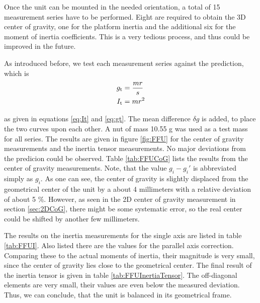 \documentclass[journal]{IEEEtran}
\begin{document}
Once the unit can be mounted in the needed orientation, a total of 15 measurement series have to be performed. Eight are required to obtain the 3D center of gravity, one for the platform inertia and the additional six for the moment of inertia coefficients.
This is a very tedious process, and thus could be improved in the future.

As introduced before, we test each measurement series against the prediction, which is
\begin{align*}
	g_{\textup{t}} & =	\frac{mr}{s} \\
	I_{\textup{t}} & = mr^2
\end{align*}

as given in equations \eqref{eq:It} and \eqref{eq:gt}. The mean difference $\delta g$ is added, to place the two curves upon each other.
A nut of mass 10.55 g was used as a test mass for all series.
The results are given in figure \ref{fig:FFU} for the center of gravity measurements and the inertia tensor measurements.
No major deviations from the predicion could be observed.
Table \ref{tab:FFUCoG} lists the results from the center of gravity measurements.
Note, that the value $g_i - g_i'$ is abbreviated simply as $g_i$.
As one can see, the center of gravity is slightly displaced from the geometrical center of the unit by a about 4 millimeters with a relative deviation of about 5 \%.
However, as seen in the 2D center of gravity measurement in section \ref{sec:2DCoG}, there might be some systematic error, so the real center could be shifted by another few millimeters.

The results on the inertia measurements for the single axis are listed in table \ref{tab:FFUI}. Also listed there are the values for the parallel axis correction. Comparing these to the actual moments of inertia, their magnitude is very small, since the center of gravity lies close to the geometrical center.
The final result of the inertia tensor is given in table \ref{tab:FFUInertiaTensor}. The off-diagonal elements are very small, their values are even below the measured deviation.
Thus, we can conclude, that the unit is balanced in its geometrical frame.
\end{document}

